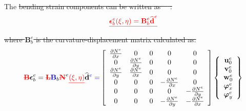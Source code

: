 \documentclass[materials,article,submit,moreauthors,pdftex]{Definitions/mdpi}
\providecommand{\DIFadd}[1]{{\protect\color{blue}{#1}}} %
\providecommand{\DIFdel}[1]{{\protect\color{red}\sout{#1}}}                      %
\providecommand{\DIFaddbegin}{} %
\providecommand{\DIFaddend}{} %
\providecommand{\DIFdelbegin}{} %
\providecommand{\DIFdelend}{} %
\begin{document}
The \DIFdelbegin \DIFdel{bending strain components can be written as~\mbox{%
\cite{ferreira2008matlab}}\hspace{0pt}%
:
}\begin{eqnarray*}
\DIFdel{\boldsymbol{\epsilon}_b^e(\xi,\eta)=\textbf{B}_b^e\widehat{\textbf{d}}^e
}\end{eqnarray*}%
\DIFdel{where \(\textbf{B}_b^e\) is the curvature-displacement matrix calculated as:
}\DIFdelend \DIFaddbegin \DIFadd{nodal bending strain-displacement relations are given in the form:
}\DIFaddend \begin{eqnarray}
\DIFdelbegin \textbf{\DIFdel{B}}%
\DIFdelend \DIFaddbegin \boldsymbol{\epsilon}\DIFaddend _b^e =
\DIFdelbegin \textbf{\DIFdel{L}}%
\DIFdelend \DIFaddbegin \textbf{\DIFadd{B}}\DIFaddend _b\DIFdelbegin \textbf{\DIFdel{N}}%
\DIFdelend ^e\DIFdelbegin \DIFdel{(\xi,\eta)
}\DIFdelend \DIFaddbegin \widehat{\textbf{d}}\DIFadd{^e = 
}\left [
\begin{array}{ccccc}
\frac{\partial N^e}{\partial x} & 0 & 0 & 0 & 0\\
0 & \frac{\partial N^e}{\partial y} & 0 & 0 & 0\\
\frac{\partial N^e}{\partial y} & \frac{\partial N^e}{\partial x} & 0 & 0 & 0\\
0 & 0 & 0 & -\frac{\partial N^e}{\partial x} & 0\\
0 & 0 & 0 & 0 & -\frac{\partial N^e}{\partial y}\\
0 & 0 & 0 & -\frac{\partial N^e}{\partial y} & -\frac{\partial N^e}{\partial x}
\end{array} \right]
\left \{ \begin{array}{c}
\textbf{u}_0^e \\
\textbf{v}_0^e \\
\textbf{w}_0^e \\
\boldsymbol{\varphi}_x^e \\
\boldsymbol{\varphi}_y^e
\end{array} \right\}
\DIFaddend \end{eqnarray}
\end{document}

